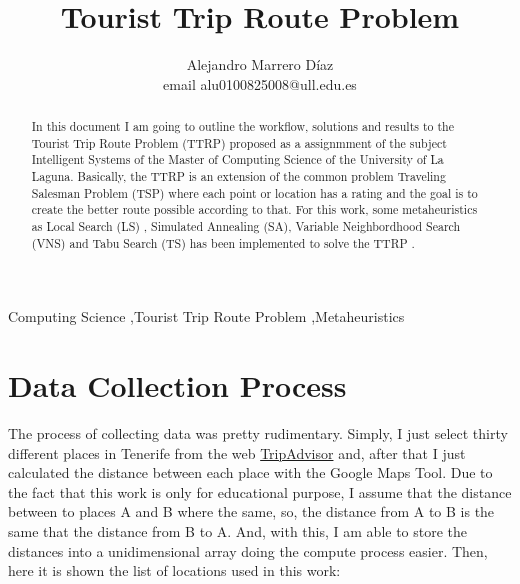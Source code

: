 \documentclass[preprint,14pt]{elsarticle}
\begin{document}
\begin{frontmatter}


\title{\textbf{Tourist Trip Route Problem}}
\author{Alejandro Marrero Díaz \\ email {alu0100825008@ull.edu.es}}
\address{La Laguna, Tenerife, ES}

\begin{abstract}
In this document I am going to outline the workflow, solutions and results to the Tourist Trip Route Problem (TTRP) \cite{TTRP1, TTRP2} proposed as a assignmment of the subject Intelligent Systems of the Master of Computing Science of the University of La Laguna.
Basically, the TTRP is an extension of the common problem Traveling Salesman Problem (TSP) where each point or location has a rating and the goal is to create the better route possible according to that.
For this work, some metaheuristics as Local Search (LS) \cite{LS}, Simulated Annealing (SA)\cite{SA, SA1, SA2, SA3}, Variable Neighbordhood Search (VNS) \cite{vns} and Tabu Search (TS)\cite{metabook} has been implemented to solve the TTRP \cite{TTRP1, TTRP2}.
\end{abstract}
\begin{keyword}
Computing Science \sep Tourist Trip Route Problem \sep Metaheuristics
\end{keyword}
\end{frontmatter}


\section{Data Collection Process}
\label{S:data}
The process of collecting data was pretty rudimentary. Simply, I just select thirty different places in Tenerife from the web \href{https://www.tripadvisor.es/Attractions-g187479-Activities-Tenerife_Canary_Islands.html}{TripAdvisor} and, after that I just calculated the distance between each place with the Google Maps Tool. Due to the fact that this work is only for educational purpose, I assume that the distance between to places A and B where the same, so, the distance from A to B is the same that the distance from B to A. And, with this, I am able to store the distances into a unidimensional array doing the compute process easier.
Then, here it is shown the list of locations used in this work: \\
\end{document}
